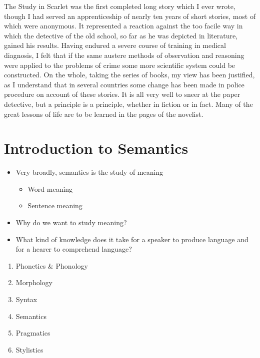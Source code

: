 \documentclass[a4paper,landscape,headrule,footrule,xetex,25pt]{foils}
\begin{document}
The Study in Scarlet was the first completed long story which I ever
wrote, though I had served an apprenticeship of nearly ten years of
short stories, most of which were anonymous. It represented a reaction
against the too facile way in which the detective of the old school,
so far as he was depicted in literature, gained his results. Having
endured a severe course of training in medical diagnosis, I felt that
if the same austere methods of observation and reasoning were applied
to the problems of crime some more scientific system could be
constructed.
\newpage
On the whole, taking the series of books, my view has
been justified, as I understand that in several countries some change
has been made in police procedure on account of these stories. It is
all very well to sneer at the paper detective, but a principle is a
principle, whether in fiction or in fact. Many of the great lessons of
life are to be learned in the pages of the novelist.



\section{Introduction to Semantics}

\begin{itemize}
\item Very broadly, semantics is the study of meaning
  \begin{itemize}
  \item Word meaning
  \item Sentence meaning
  \end{itemize}
\item Why do we want to study meaning?
\item What kind of knowledge does it take for a speaker to produce language and for a hearer to comprehend language? 
\end{itemize}

\begin{enumerate}\addtolength{\itemsep}{-0.75ex}
\item Phonetics \& Phonology
\item Morphology
\item Syntax
\item Semantics
\item Pragmatics
\item Stylistics
\end{enumerate}
\end{document}
